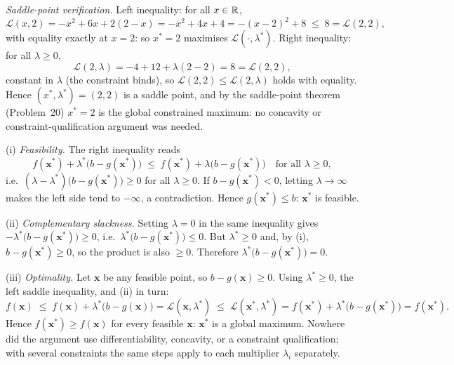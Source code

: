 \begin{solutions}
        \emph{Saddle-point verification.} Left inequality: for all
        $x \in \mathbb{R}$,
        \[
          \mathcal{L}(x, 2) = -x^2 + 6 x + 2(2 - x)
                            = -x^2 + 4 x + 4
                            = -(x - 2)^2 + 8 \;\leq\; 8
                            = \mathcal{L}(2, 2),
        \]
        with equality exactly at $x = 2$: so $x^* = 2$ maximises
        $\mathcal{L}(\cdot, \lambda^*)$. Right inequality: for all
        $\lambda \geq 0$,
        \[
          \mathcal{L}(2, \lambda) = -4 + 12 + \lambda(2 - 2) = 8
                                  = \mathcal{L}(2, 2),
        \]
        constant in $\lambda$ (the constraint binds), so
        $\mathcal{L}(2, 2) \leq \mathcal{L}(2, \lambda)$ holds with
        equality. Hence $(x^*, \lambda^*) = (2, 2)$ is a saddle point, and
        by the saddle-point theorem (Problem~20) $x^* = 2$ is the global
        constrained maximum: no concavity or constraint-qualification
        argument was needed.

  \item (i) \emph{Feasibility.} The right inequality reads
        \[
          f(\mathbf{x}^*) + \lambda^*\bigl(b - g(\mathbf{x}^*)\bigr)
          \;\leq\;
          f(\mathbf{x}^*) + \lambda\bigl(b - g(\mathbf{x}^*)\bigr)
          \quad \text{for all } \lambda \geq 0,
        \]
        i.e.\ $(\lambda - \lambda^*)\bigl(b - g(\mathbf{x}^*)\bigr) \geq 0$
        for all $\lambda \geq 0$. If $b - g(\mathbf{x}^*) < 0$, letting
        $\lambda \to \infty$ makes the left side tend to $-\infty$, a
        contradiction. Hence $g(\mathbf{x}^*) \leq b$: $\mathbf{x}^*$ is
        feasible.

        (ii) \emph{Complementary slackness.} Setting $\lambda = 0$ in the
        same inequality gives
        $-\lambda^*\bigl(b - g(\mathbf{x}^*)\bigr) \geq 0$, i.e.\
        $\lambda^*\bigl(b - g(\mathbf{x}^*)\bigr) \leq 0$. But
        $\lambda^* \geq 0$ and, by (i), $b - g(\mathbf{x}^*) \geq 0$, so
        the product is also $\geq 0$. Therefore
        $\lambda^*\bigl(b - g(\mathbf{x}^*)\bigr) = 0$.

        (iii) \emph{Optimality.} Let $\mathbf{x}$ be any feasible point,
        so $b - g(\mathbf{x}) \geq 0$. Using $\lambda^* \geq 0$, the left
        saddle inequality, and (ii) in turn:
        \[
          f(\mathbf{x})
          \;\leq\; f(\mathbf{x})
             + \lambda^*\bigl(b - g(\mathbf{x})\bigr)
          = \mathcal{L}(\mathbf{x}, \lambda^*)
          \;\leq\; \mathcal{L}(\mathbf{x}^*, \lambda^*)
          = f(\mathbf{x}^*)
             + \lambda^*\bigl(b - g(\mathbf{x}^*)\bigr)
          = f(\mathbf{x}^*) .
        \]
        Hence $f(\mathbf{x}^*) \geq f(\mathbf{x})$ for every feasible
        $\mathbf{x}$: $\mathbf{x}^*$ is a global maximum. Nowhere did the
        argument use differentiability, concavity, or a constraint
        qualification; with several constraints the same steps apply to
        each multiplier $\lambda_i$ separately.
\end{solutions}

